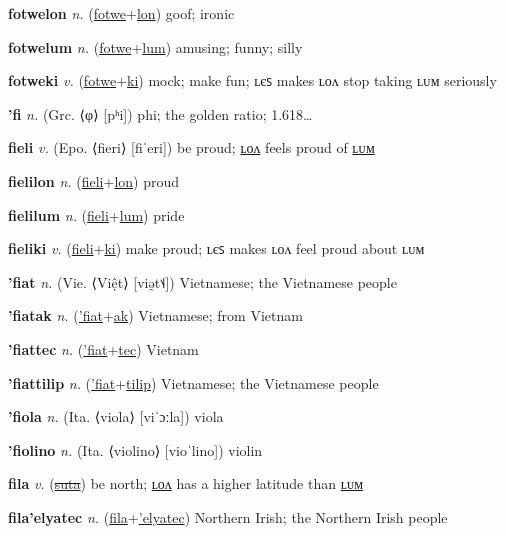 \textbf{\hypertarget{fotwelon}{fotwelon}} \textit{n.} (\hyperlink{fotwe}{fotwe}+\allowbreak \hyperlink{lon}{lon})
goof; ironic

\textbf{\hypertarget{fotwelum}{fotwelum}} \textit{n.} (\hyperlink{fotwe}{fotwe}+\allowbreak \hyperlink{lum}{lum})
amusing; funny; silly

\textbf{\hypertarget{fotweki}{fotweki}} \textit{v.} (\hyperlink{fotwe}{fotwe}+\allowbreak \hyperlink{ki}{ki})
mock; make fun; ʟєꜱ makes ʟᴏᴧ stop taking ʟᴜᴍ seriously

\textbf{\hypertarget{'fi}{'fi}} \textit{n.} (Grc. ⟨φ⟩ [pʰi])
phi; the golden ratio; 1.618…

\textbf{\hypertarget{fieli}{fieli}} \textit{v.} (Epo. ⟨fieri⟩ [fiˈeri])
be proud; \hyperlink{fielilon}{ʟᴏᴧ} feels proud of \hyperlink{fielilum}{ʟᴜᴍ}

\textbf{\hypertarget{fielilon}{fielilon}} \textit{n.} (\hyperlink{fieli}{fieli}+\allowbreak \hyperlink{lon}{lon})
proud

\textbf{\hypertarget{fielilum}{fielilum}} \textit{n.} (\hyperlink{fieli}{fieli}+\allowbreak \hyperlink{lum}{lum})
pride

\textbf{\hypertarget{fieliki}{fieliki}} \textit{v.} (\hyperlink{fieli}{fieli}+\allowbreak \hyperlink{ki}{ki})
make proud; ʟєꜱ makes ʟᴏᴧ feel proud about ʟᴜᴍ

\textbf{\hypertarget{'fiat}{'fiat}} \textit{n.} (Vie. ⟨Việt⟩ [viə̯t˦˨])
Vietnamese; the Vietnamese people

\textbf{\hypertarget{'fiatak}{'fiatak}} \textit{n.} (\hyperlink{'fiat}{'fiat}+\allowbreak \hyperlink{ak}{ak})
Vietnamese; from Vietnam

\textbf{\hypertarget{'fiattec}{'fiattec}} \textit{n.} (\hyperlink{'fiat}{'fiat}+\allowbreak \hyperlink{tec}{tec})
Vietnam

\textbf{\hypertarget{'fiattilip}{'fiattilip}} \textit{n.} (\hyperlink{'fiat}{'fiat}+\allowbreak \hyperlink{tilip}{tilip})
Vietnamese; the Vietnamese people

\textbf{\hypertarget{'fiola}{'fiola}} \textit{n.} (Ita. ⟨viola⟩ [viˈɔːla])
viola

\textbf{\hypertarget{'fiolino}{'fiolino}} \textit{n.} (Ita. ⟨violino⟩ [vioˈlino])
violin

\textbf{\hypertarget{fila}{fila}} \textit{v.} (\hyperlink{suta}{\sout{suta}})
be north; \hyperlink{filalon}{ʟᴏᴧ} has a higher latitude than \hyperlink{filalum}{ʟᴜᴍ}

\textbf{\hypertarget{fila'elyatec}{fila'elyatec}} \textit{n.} (\hyperlink{fila}{fila}+\allowbreak \hyperlink{'elyatec}{'elyatec})
Northern Irish; the Northern Irish people

